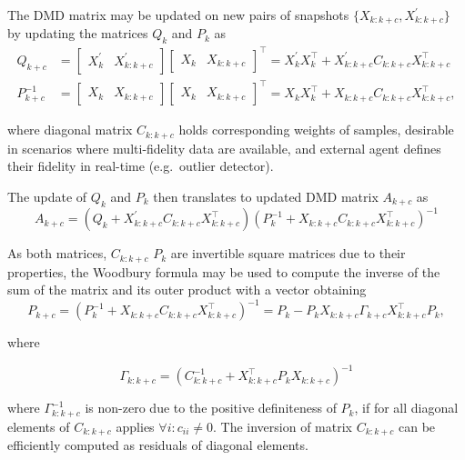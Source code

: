 The DMD matrix may be updated on new pairs of snapshots \( \{X_{k: k + c}, X^\prime_{k: k + c}\} \) by updating the matrices \(Q_k\) and \(P_k\) as
\begin{align*}
	Q_{k+c}      & = \begin{bmatrix} X^\prime_k  & X^\prime_{k : k + c} \end{bmatrix} \begin{bmatrix} X_{k} & X_{k : k + c} \end{bmatrix}^\top = X^\prime_k X_{k}^\top + X^\prime_{k : k + c} C_{k : k + c} X_{k : k + c}^\top \\
	P^{-1}_{k+c} & = \begin{bmatrix} X_{k} & X_{k : k + c} \end{bmatrix} \begin{bmatrix} X_{k} & X_{k : k + c} \end{bmatrix}^\top = X_{k}X_{k}^\top + X_{k : k + c} C_{k : k + c} X_{k : k + c}^\top,
\end{align*}

where diagonal matrix \(C_{k: k + c}\) holds corresponding weights of samples, desirable in scenarios where multi-fidelity data are available, and external agent defines their fidelity in real-time (e.g.~outlier detector).

The update of \(Q_k\) and \(P_k\) then translates to updated DMD matrix \(A_{k+c}\) as
\begin{equation}
	A_{k+c} = (Q_k + X^\prime_{k : k + c} C_{k : k + c} X_{k : k + c}^\top) {(P_k^{-1} + X_{k : k + c} C_{k : k + c} X_{k : k + c}^\top)}^{-1}
\end{equation}

As both matrices, \(C_{k: k + c}\) \(P_k\) are invertible square matrices due to their properties, the Woodbury formula may be used to compute the inverse of the sum of the matrix and its outer product with a vector obtaining
\begin{equation}\label{eq:precision-matrix-update}
	P_{k+c} = {(P_k^{-1} + X_{k : k + c} C_{k : k + c} X_{k : k + c}^\top)}^{-1} = P_k - P_k X_{k : k + c} \Gamma_{k+c} X_{k : k + c}^\top P_k,
\end{equation}

where

\begin{equation}
	\Gamma_{k : k + c} = {(C_{k : k + c}^{-1} + X_{k : k + c}^\top P_k X_{k : k + c})}^{-1}
\end{equation}

where \(\Gamma_{k : k + c}^{-1}\) is non-zero due to the positive definiteness of \(P_k\), if for all diagonal elements of \(C_{k : k + c}\) applies \( \forall i : c_{ii} \neq 0 \). The inversion of matrix \(C_{k: k + c}\) can be efficiently computed as residuals of diagonal elements.

